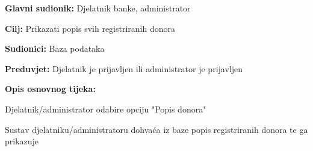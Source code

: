 \eject 
\noindent {}
					\begin{packed_item}
	
						\item \textbf{Glavni sudionik: }Djelatnik banke, administrator
						\item \textbf{Cilj:} Prikazati popis svih registriranih donora
						\item \textbf{Sudionici:} Baza podataka
						\item \textbf{Preduvjet:} Djelatnik je prijavljen ili administrator je prijavljen
						\item \textbf{Opis osnovnog tijeka:}
						
						\item[] \begin{packed_enum}
	
							\item Djelatnik/administrator odabire opciju "Popis donora"
							\item Sustav djelatniku/administratoru dohvaća iz baze popis registriranih donora te ga prikazuje
						\end{packed_enum}

					\end{packed_item}


